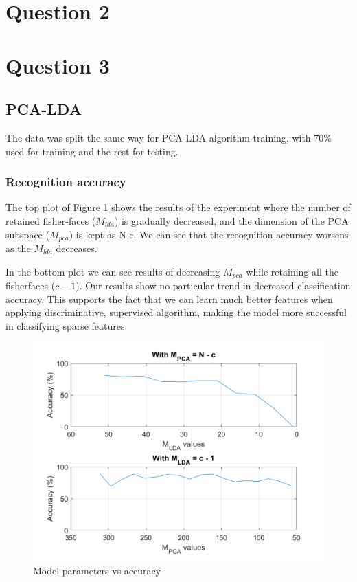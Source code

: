 \documentclass[10pt,technote]{IEEEtran}
\begin{document}
\section{Question 2}



\section{Question 3}
\subsection{PCA-LDA}
The data was split the same way for PCA-LDA algorithm training, with 70\% used for training and the rest for testing. 

\subsubsection{Recognition accuracy}
The top plot of Figure \ref{fig:mod_params_vs_acc} shows the results of  the experiment where the number of retained fisher-faces ($M_{lda}$) is gradually decreased, and the dimension of the PCA subspace ($M_{pca}$) is kept as N-c. We can see that the recognition accuracy worsens as the $M_{lda}$ decreases.

In the bottom plot we can see results of decreasing $M_{pca}$ while retaining all the fisherfaces ($c-1$). Our results show no particular trend in decreased classification accuracy. This supports the fact that we can learn much better features when applying discriminative, supervised algorithm, making the model more successful in classifying sparse features.

\begin{figure}
    \centering
    \includegraphics[width = \linewidth]{../results/ex2LDA/accuracy_vs_Ms.png}
    \caption{Model parameters vs accuracy}
    \label{fig:mod_params_vs_acc}
\end{figure}
\end{document}
